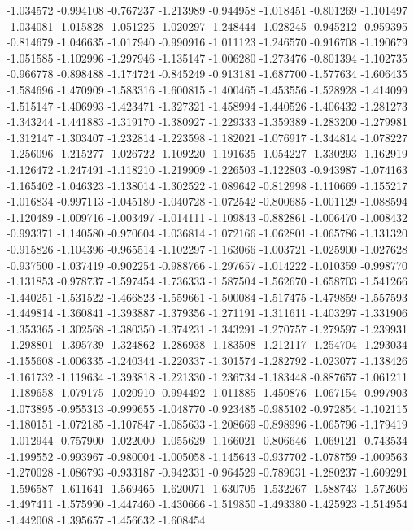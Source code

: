 -1.034572
-0.994108
-0.767237
-1.213989
-0.944958
-1.018451
-0.801269
-1.101497
-1.034081
-1.015828
-1.051225
-1.020297
-1.248444
-1.028245
-0.945212
-0.959395
-0.814679
-1.046635
-1.017940
-0.990916
-1.011123
-1.246570
-0.916708
-1.190679
-1.051585
-1.102996
-1.297946
-1.135147
-1.006280
-1.273476
-0.801394
-1.102735
-0.966778
-0.898488
-1.174724
-0.845249
-0.913181
-1.687700
-1.577634
-1.606435
-1.584696
-1.470909
-1.583316
-1.600815
-1.400465
-1.453556
-1.528928
-1.414099
-1.515147
-1.406993
-1.423471
-1.327321
-1.458994
-1.440526
-1.406432
-1.281273
-1.343244
-1.441883
-1.319170
-1.380927
-1.229333
-1.359389
-1.283200
-1.279981
-1.312147
-1.303407
-1.232814
-1.223598
-1.182021
-1.076917
-1.344814
-1.078227
-1.256096
-1.215277
-1.026722
-1.109220
-1.191635
-1.054227
-1.330293
-1.162919
-1.126472
-1.247491
-1.118210
-1.219909
-1.226503
-1.122803
-0.943987
-1.074163
-1.165402
-1.046323
-1.138014
-1.302522
-1.089642
-0.812998
-1.110669
-1.155217
-1.016834
-0.997113
-1.045180
-1.040728
-1.072542
-0.800685
-1.001129
-1.088594
-1.120489
-1.009716
-1.003497
-1.014111
-1.109843
-0.882861
-1.006470
-1.008432
-0.993371
-1.140580
-0.970604
-1.036814
-1.072166
-1.062801
-1.065786
-1.131320
-0.915826
-1.104396
-0.965514
-1.102297
-1.163066
-1.003721
-1.025900
-1.027628
-0.937500
-1.037419
-0.902254
-0.988766
-1.297657
-1.014222
-1.010359
-0.998770
-1.131853
-0.978737
-1.597454
-1.736333
-1.587504
-1.562670
-1.658703
-1.541266
-1.440251
-1.531522
-1.466823
-1.559661
-1.500084
-1.517475
-1.479859
-1.557593
-1.449814
-1.360841
-1.393887
-1.379356
-1.271191
-1.311611
-1.403297
-1.331906
-1.353365
-1.302568
-1.380350
-1.374231
-1.343291
-1.270757
-1.279597
-1.239931
-1.298801
-1.395739
-1.324862
-1.286938
-1.183508
-1.212117
-1.254704
-1.293034
-1.155608
-1.006335
-1.240344
-1.220337
-1.301574
-1.282792
-1.023077
-1.138426
-1.161732
-1.119634
-1.393818
-1.221330
-1.236734
-1.183448
-0.887657
-1.061211
-1.189658
-1.079175
-1.020910
-0.994492
-1.011885
-1.450876
-1.067154
-0.997903
-1.073895
-0.955313
-0.999655
-1.048770
-0.923485
-0.985102
-0.972854
-1.102115
-1.180151
-1.072185
-1.107847
-1.085633
-1.208669
-0.898996
-1.065796
-1.179419
-1.012944
-0.757900
-1.022000
-1.055629
-1.166021
-0.806646
-1.069121
-0.743534
-1.199552
-0.993967
-0.980004
-1.005058
-1.145643
-0.937702
-1.078759
-1.009563
-1.270028
-1.086793
-0.933187
-0.942331
-0.964529
-0.789631
-1.280237
-1.609291
-1.596587
-1.611641
-1.569465
-1.620071
-1.630705
-1.532267
-1.588743
-1.572606
-1.497411
-1.575990
-1.447460
-1.430666
-1.519850
-1.493380
-1.425923
-1.514954
-1.442008
-1.395657
-1.456632
-1.608454
